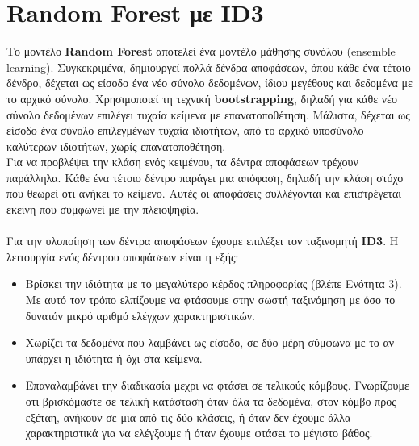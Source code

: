 \documentclass[12pt]{article}
\begin{document}
\section{Random Forest με ID3}
Το μοντέλο \textbf{Random Forest} αποτελεί ένα μοντέλο μάθησης συνόλου (ensemble learning). Συγκεκριμένα, δημιουργεί πολλά δένδρα αποφάσεων, όπου κάθε ένα τέτοιο δένδρο, δέχεται ως είσοδο ένα νέο σύνολο δεδομένων, ίδιου μεγέθους και δεδομένα με το αρχικό σύνολο. Xρησιμοποιεί τη τεχνική \textbf{bootstrapping}, δηλαδή για κάθε νέο σύνολο δεδομένων επιλέγει τυχαία κείμενα με επανατοποθέτηση. Μάλιστα, δέχεται ως είσοδο ένα σύνολο επιλεγμένων τυχαία ιδιοτήτων, από το αρχικό υποσύνολο καλύτερων ιδιοτήτων, χωρίς επανατοποθέτηση.\\
Για να προβλέψει την κλάση ενός κειμένου, τα δέντρα αποφάσεων τρέχουν παράλληλα. Κάθε ένα τέτοιο δέντρο παράγει μια απόφαση, δηλαδή την κλάση στόχο που θεωρεί οτι ανήκει το κείμενο. Αυτές οι αποφάσεις συλλέγονται και επιστρέγεται εκείνη που συμφωνεί με την πλειοψηφία.\\\\
Για την υλοποίηση των δέντρα αποφάσεων έχουμε επιλέξει τον ταξινομητή \textbf{ID3}. Η λειτουργία ενός δέντρου αποφάσεων είναι η εξής: 
\begin{itemize}
    \item Βρίσκει την ιδιότητα με το μεγαλύτερο κέρδος πληροφορίας (βλέπε Ενότητα 3). Με αυτό τον τρόπο ελπίζουμε να φτάσουμε στην σωστή ταξινόμηση με όσο το δυνατόν μικρό αριθμό ελέγχων χαρακτηριστικών.
    \item Χωρίζει τα δεδομένα που λαμβάνει ως είσοδο, σε δύο μέρη σύμφωνα με το αν υπάρχει η ιδιότητα ή όχι στα κείμενα.
    \item Επαναλαμβάνει την διαδικασία μεχρι να φτάσει σε τελικούς κόμβους. Γνωρίζουμε οτι βρισκόμαστε σε τελική κατάσταση όταν όλα τα δεδομένα, στον κόμβο προς εξέταη, ανήκουν σε μια από τις δύο κλάσεις, ή όταν δεν έχουμε άλλα χαρακτηριστικά για να ελέγξουμε ή όταν έχουμε φτάσει το μέγιστο βάθος.
\end{itemize}
\end{document}
